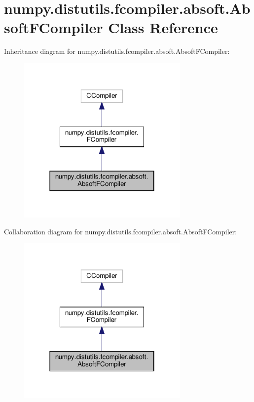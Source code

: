 \hypertarget{classnumpy_1_1distutils_1_1fcompiler_1_1absoft_1_1AbsoftFCompiler}{}\section{numpy.\+distutils.\+fcompiler.\+absoft.\+Absoft\+F\+Compiler Class Reference}
\label{classnumpy_1_1distutils_1_1fcompiler_1_1absoft_1_1AbsoftFCompiler}


Inheritance diagram for numpy.\+distutils.\+fcompiler.\+absoft.\+Absoft\+F\+Compiler\+:
\nopagebreak
\begin{figure}[H]
\begin{center}
\leavevmode
\includegraphics[width=238pt]{classnumpy_1_1distutils_1_1fcompiler_1_1absoft_1_1AbsoftFCompiler__inherit__graph}
\end{center}
\end{figure}


Collaboration diagram for numpy.\+distutils.\+fcompiler.\+absoft.\+Absoft\+F\+Compiler\+:
\nopagebreak
\begin{figure}[H]
\begin{center}
\leavevmode
\includegraphics[width=238pt]{classnumpy_1_1distutils_1_1fcompiler_1_1absoft_1_1AbsoftFCompiler__coll__graph}
\end{center}
\end{figure}
